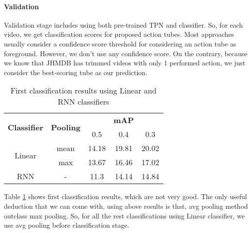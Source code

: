 \paragraph{Validation} Validation stage includes using both pre-trained TPN and classifier. So, for each video,
we get classification scores for proposed action tubes. Most approaches usually consider a confidence score threshold for
considering an action tube as foreground. However, we don't use any confidence score. On the contrary, because we
know that JHMDB has trimmed videos with only 1 performed action, we just consider the best-scoring tube as our prediction.


\begin{table}[h]
  \centering
  \begin{tabular}{|| c | c || c  c  c ||}
    \hline
    \multirow{2}{*}{\textbf{Classifier}} & \multirow{2}{*}{\textbf{Pooling}} &  {} & \textbf{mAP} & {} \\
    {} & {} & 0.5 & 0.4 & 0.3 \\
    \hline
    \multirow{2}{*}{Linear} & mean & 14.18 & 19.81 & 20.02 \\
    \cline{2-5}
    {} & max & 13.67 & 16.46 & 17.02 \\
    \hline
    RNN  & -  & 11.3 & 14.14 & 14.84 \\
    \hline
  \end{tabular}
  \caption{First classification results using Linear and RNN classifiers}
  \label{table:rnn_linear}
\end{table}

  
Table \ref{table:rnn_linear} shows first classification results, which are not very good. The only useful deduction that we can come with, using above results is that, avg pooling
method outclass max pooling. So, for all the rest classifications using Linear classifier, we use avg pooling before classification
stage.

